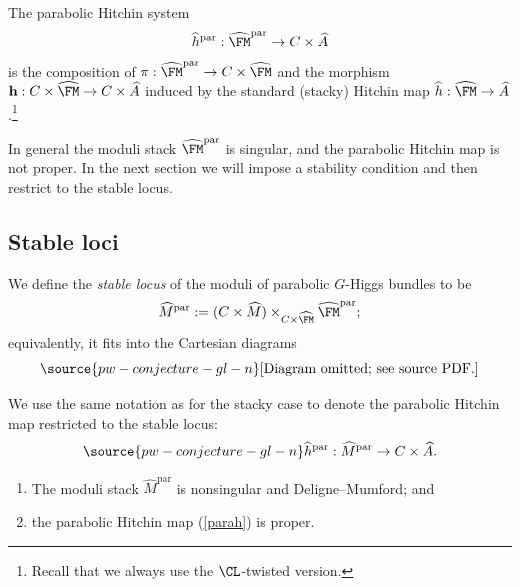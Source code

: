 The parabolic Hitchin system
\[
\widehat{h}^\mathrm{par}: \widehat{\FM}^{\mathrm{par}} \to C\times \widehat{A}
\]
is the composition of $\pi:\widehat{\FM}^{\mathrm{par}} \to C\times \widehat{\FM}$ and the morphism $\mathbf{h}: C\times \widehat{\FM} \to C\times \widehat{A}$
induced by the standard (stacky) Hitchin map $\widehat{h}: \widehat{\FM} \to \widehat{A}$.\footnote{Recall that we always use the $\CL$-twisted version.}

In general the moduli stack $\widehat{\FM}^{\mathrm{par}}$ is singular, and the parabolic Hitchin map is not proper. In the next section we will impose a stability condition and then restrict to the stable locus.

\subsection{Stable loci}

We define the \emph{stable locus} of the moduli of parabolic $G$-Higgs bundles to be
\[
\widehat{M}^{\mathrm{par}}: = (C \times \widehat{M}) \times_{C \times \widehat{\FM}} \widehat{\FM}^{{\mathrm{par}}};
\]
equivalently, it fits into the Cartesian diagrams
\begin{equation}\label{diag0}
\source{pw-conjecture-gl-n}
\text{[Diagram omitted; see source PDF.]}
\end{equation}

We use the same notation as for the stacky case to denote the parabolic Hitchin map restricted to the stable locus:
\begin{equation}\label{parah}
\source{pw-conjecture-gl-n}
\widehat{h}^{\mathrm{par}}: \widehat{M}^{\mathrm{par}} \to C\times \widehat{A}.
\end{equation}

\begin{prop}
\notready\label{prop3.1}
\begin{enumerate}
    \item[(i)] The moduli stack $\widehat{M}^{\mathrm{par}}$ is nonsingular and Deligne--Mumford; and
    \item[(ii)] the parabolic Hitchin map (\ref{parah}) is proper.
\end{enumerate}
\end{prop}

